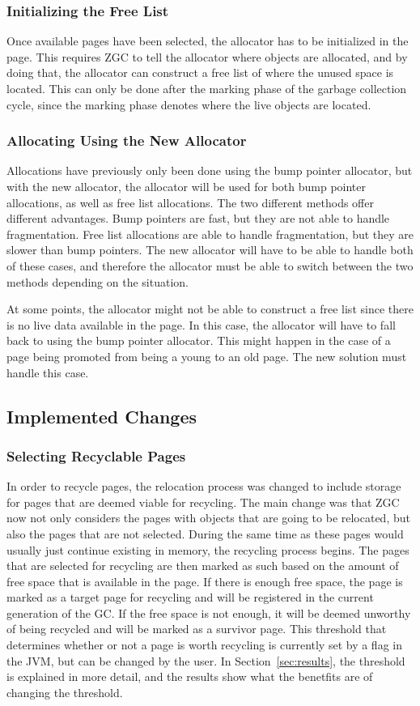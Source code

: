 \subsubsection{Initializing the Free List}
Once available pages have been selected, the allocator has to be initialized in the page. This requires ZGC to tell the allocator where objects are allocated, and by doing that, the allocator can construct a free list of where the unused space is located. This can only be done after the marking phase of the garbage collection cycle, since the marking phase denotes where the live objects are located. 

\subsubsection{Allocating Using the New Allocator}
Allocations have previously only been done using the bump pointer allocator, but with the new allocator, the allocator will be used for both bump pointer allocations, as well as free list allocations. The two different methods offer different advantages. Bump pointers are fast, but they are not able to handle fragmentation. Free list allocations are able to handle fragmentation, but they are slower than bump pointers. The new allocator will have to be able to handle both of these cases, and therefore the allocator must be able to switch between the two methods depending on the situation. 

At some points, the allocator might not be able to construct a free list since there is no live data available in the page. In this case, the allocator will have to fall back to using the bump pointer allocator. This might happen in the case of a page being promoted from being a young to an old page. The new solution must handle this case.

\subsection{Implemented Changes}
\subsubsection{Selecting Recyclable Pages}
In order to recycle pages, the relocation process was changed to include storage for pages that are deemed viable for recycling. The main change was that ZGC now not only considers the pages with objects that are going to be relocated, but also the pages that are not selected. During the same time as these pages would usually just continue existing in memory, the recycling process begins. The pages that are selected for recycling are then marked as such based on the amount of free space that is available in the page. If there is enough free space, the page is marked as a target page for recycling and will be registered in the current generation of the GC. If the free space is not enough, it will be deemed unworthy of being recycled and will be marked as a survivor page. This threshold that determines whether or not a page is worth recycling is currently set by a flag in the JVM, but can be changed by the user. In Section~\ref{sec:results}, the threshold is explained in more detail, and the results show what the benetfits are of changing the threshold.

